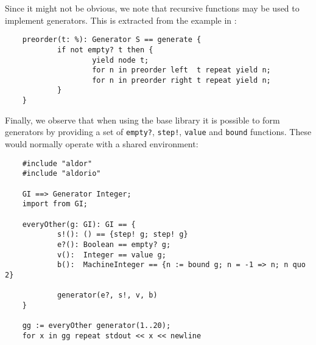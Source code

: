 Since it might not be obvious, we note
that recursive functions may be used to implement generators.  
This is extracted from the  example in :

\begin{small}
\begin{verbatim}
    preorder(t: %): Generator S == generate {
            if not empty? t then {
                    yield node t;
                    for n in preorder left  t repeat yield n;
                    for n in preorder right t repeat yield n;
            }
    }
\end{verbatim}
\end{small}

Finally, we observe that when using the base library it is possible to
form generators by providing a set of \verb"empty?", \verb"step!",
\verb"value" and \verb"bound" functions.  
These would normally operate with a shared environment:

\begin{small}
\begin{verbatim}
    #include "aldor"
    #include "aldorio"
    
    GI ==> Generator Integer;
    import from GI;
    
    everyOther(g: GI): GI == {
            s!(): () == {step! g; step! g}
            e?(): Boolean == empty? g;
            v():  Integer == value g;
            b():  MachineInteger == {n := bound g; n = -1 => n; n quo 2}
    
            generator(e?, s!, v, b)
    }
    
    gg := everyOther generator(1..20);
    for x in gg repeat stdout << x << newline
\end{verbatim}
\end{small}

